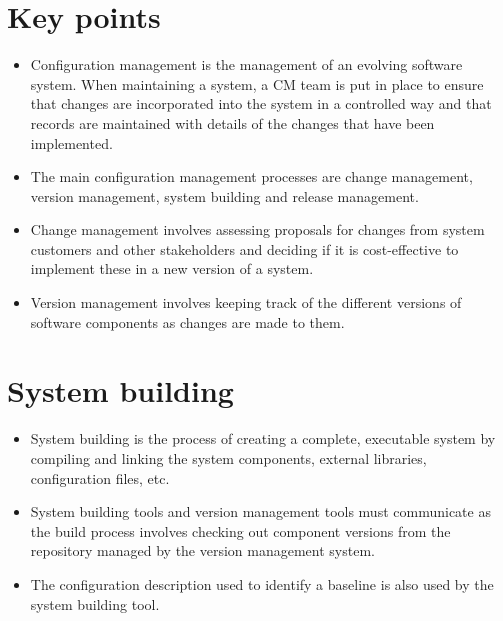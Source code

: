 \section{Key points}
\begin{itemize}

\item Configuration management is the management of an evolving software system. When maintaining a system, a CM team is put in place to ensure that changes are incorporated into the system in a controlled way and that records are maintained with details of the changes that have been implemented.

\item The main configuration management processes are change management, version management, system building and release management.

\item Change management involves assessing proposals for changes from system customers and other stakeholders and deciding if it is cost-effective to implement these in a new version of a system.

\item Version management involves keeping track of the different versions of software components as changes are made to them.
\end{itemize}
\section{System building}
\begin{itemize}

\item System building is the process of creating a complete, executable system by compiling and linking the system components, external libraries, configuration files, etc.

\item System building tools and version management tools must communicate as the build process involves checking out component versions from the repository managed by the version management system.

\item The configuration description used to identify a baseline is also used by the system building tool.


\end{itemize}
